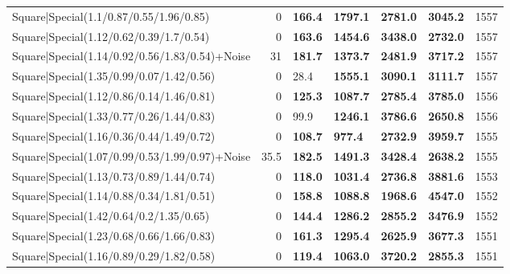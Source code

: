 \begin{tabular}{lrllllr}
 Square|Special(1.1/0.87/0.55/1.96/0.85)                       &             0   & \textbf{166.4} & \textbf{1797.1} & \textbf{2781.0} & \textbf{3045.2} &         1557 \\
 Square|Special(1.12/0.62/0.39/1.7/0.54)                       &             0   & \textbf{163.6} & \textbf{1454.6} & \textbf{3438.0} & \textbf{2732.0} &         1557 \\
 Square|Special(1.14/0.92/0.56/1.83/0.54)+Noise                &            31   & \textbf{181.7} & \textbf{1373.7} & \textbf{2481.9} & \textbf{3717.2} &         1557 \\
 Square|Special(1.35/0.99/0.07/1.42/0.56)                      &             0   & 28.4           & \textbf{1555.1} & \textbf{3090.1} & \textbf{3111.7} &         1557 \\
 Square|Special(1.12/0.86/0.14/1.46/0.81)                      &             0   & \textbf{125.3} & \textbf{1087.7} & \textbf{2785.4} & \textbf{3785.0} &         1556 \\
 Square|Special(1.33/0.77/0.26/1.44/0.83)                      &             0   & 99.9           & \textbf{1246.1} & \textbf{3786.6} & \textbf{2650.8} &         1556 \\
 Square|Special(1.16/0.36/0.44/1.49/0.72)                      &             0   & \textbf{108.7} & \textbf{977.4}  & \textbf{2732.9} & \textbf{3959.7} &         1555 \\
 Square|Special(1.07/0.99/0.53/1.99/0.97)+Noise                &            35.5 & \textbf{182.5} & \textbf{1491.3} & \textbf{3428.4} & \textbf{2638.2} &         1555 \\
 Square|Special(1.13/0.73/0.89/1.44/0.74)                      &             0   & \textbf{118.0} & \textbf{1031.4} & \textbf{2736.8} & \textbf{3881.6} &         1553 \\
 Square|Special(1.14/0.88/0.34/1.81/0.51)                      &             0   & \textbf{158.8} & \textbf{1088.8} & \textbf{1968.6} & \textbf{4547.0} &         1552 \\
 Square|Special(1.42/0.64/0.2/1.35/0.65)                       &             0   & \textbf{144.4} & \textbf{1286.2} & \textbf{2855.2} & \textbf{3476.9} &         1552 \\
 Square|Special(1.23/0.68/0.66/1.66/0.83)                      &             0   & \textbf{161.3} & \textbf{1295.4} & \textbf{2625.9} & \textbf{3677.3} &         1551 \\
 Square|Special(1.16/0.89/0.29/1.82/0.58)                      &             0   & \textbf{119.4} & \textbf{1063.0} & \textbf{3720.2} & \textbf{2855.3} &         1551 \\

\end{tabular}

